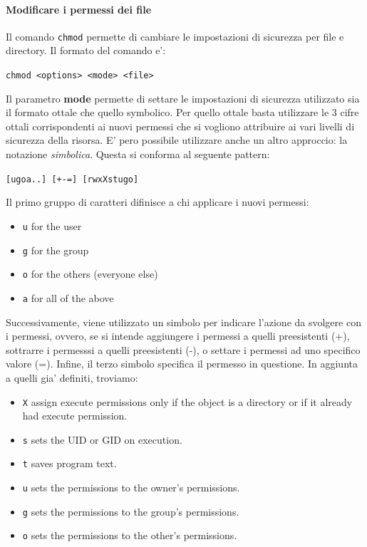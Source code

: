 \paragraph{Modificare i permessi dei file}
Il comando \texttt{chmod} permette di cambiare le impostazioni di sicurezza per file e directory. Il formato del comando e':
\begin{center}
	\texttt{chmod <options> <mode> <file>}
\end{center}
Il parametro \textbf{mode} permette di settare le impostazioni di sicurezza utilizzato sia il formato ottale che quello symbolico. Per quello ottale basta utilizzare le 3 cifre ottali corrispondenti ai nuovi permessi che si vogliono attribuire ai vari livelli di sicurezza della risorsa. E' pero possibile utilizzare anche un altro approccio: la notazione \emph{simbolica}. Questa si conforma al seguente pattern:
\begin{center}
	\texttt{[ugoa..] [+-=] [rwxXstugo]}
\end{center}
Il primo gruppo di caratteri difinisce a chi applicare i nuovi permessi:
\begin{itemize}
	\item \texttt{u} for the user 
	\item \texttt{g} for the group
	\item \texttt{o} for the others (everyone else) 
	\item \texttt{a} for all of the above
\end{itemize}
Successivamente, viene utilizzato un simbolo per indicare l'azione da svolgere con i permessi, ovvero, se si intende aggiungere i permessi a quelli preesistenti (+), sottrarre i permesssi a quelli preesistenti (-), o settare i permessi ad uno specifico valore (=).
Infine, il terzo simbolo specifica il permesso in questione. In aggiunta a quelli gia' definiti, troviamo:
\begin{itemize}
	\item \texttt{X} assign execute permissions only if the object is a directory or if it already had execute permission. 
	\item \texttt{s} sets the UID or GID on execution.
	\item \texttt{t} saves program text.
	\item \texttt{u} sets the permissions to the owner's permissions.
	\item \texttt{g} sets the permissions to the group's permissions.
	\item \texttt{o} sets the permissions to the other's permissions.
\end{itemize}


